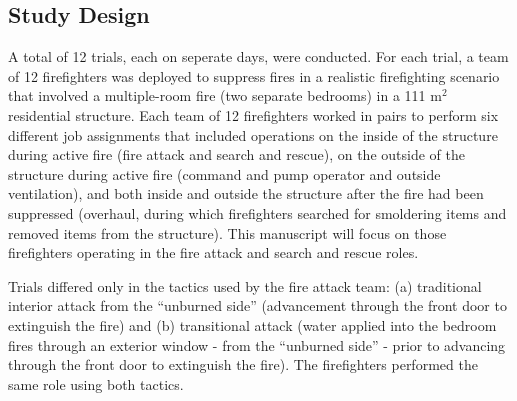 \documentclass[12pt,oneside]{article}
\begin{document}
\subsection{Study Design}
\label{subsec:design}


A total of 12 trials, each on seperate days, were conducted. For each trial, a team of 12 firefighters was deployed to suppress fires in a realistic firefighting scenario that involved a multiple-room fire (two separate bedrooms) in a 111 m$^2$ residential structure. Each team of 12 firefighters worked in pairs to perform six different job assignments that included operations on the inside of the structure during active fire (fire attack and search and rescue), on the outside of the structure during active fire (command and pump operator and outside ventilation), and both inside and outside the structure after the fire had been suppressed (overhaul, during which firefighters searched for smoldering items and removed items from the structure). This manuscript will focus on those firefighters operating in the fire attack and search and rescue roles. 

Trials differed only in the tactics used by the fire attack team: (a) traditional interior attack from the ``unburned side'' (advancement through the front door to extinguish the fire) and (b) transitional attack (water applied into the bedroom fires through an exterior window - from the ``unburned side'' - prior to advancing through the front door to extinguish the fire).  The firefighters performed the same role using both tactics. 
\end{document}
